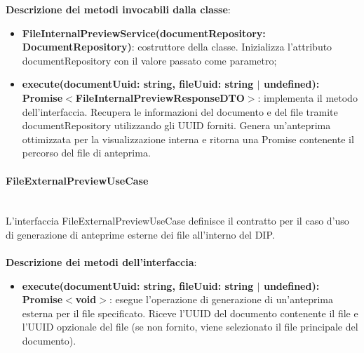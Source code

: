 \documentclass[a4paper,12pt]{article}
\begin{document}
{{{              \noindent \textbf{Descrizione dei metodi invocabili dalla classe}:
                \begin{itemize}
                    \item \textbf{FileInternalPreviewService(documentRepository: DocumentRepository)}: costruttore della classe. Inizializza l'attributo documentRepository con il valore passato come parametro;
                    \item \textbf{execute(documentUuid: string, fileUuid: string $|$ undefined):\\ Promise$<$FileInternalPreviewResponseDTO$>$}: implementa il metodo dell'interfaccia. Recupera le informazioni del documento e del file tramite documentRepository utilizzando gli UUID forniti. Genera un'anteprima ottimizzata per la visualizzazione interna e ritorna una Promise contenente il percorso del file di anteprima.
                \end{itemize}
                \paragraph{FileExternalPreviewUseCase}\label{par:FileExternalPreviewUseCase}\mbox{}\\
                L'interfaccia FileExternalPreviewUseCase definisce il contratto per il caso d'uso di generazione di anteprime esterne dei file all'interno del DIP.\\
                \\
              \noindent \textbf{Descrizione dei metodi dell'interfaccia}:
                \begin{itemize}
                    \item \textbf{execute(documentUuid: string, fileUuid: string $|$ undefined):\\ Promise$<$void$>$}: esegue l'operazione di generazione di un'anteprima esterna per il file specificato. Riceve l'UUID del documento contenente il file e l'UUID opzionale del file (se non fornito, viene selezionato il file principale del documento).
                \end{itemize}
}}}
\end{document}
